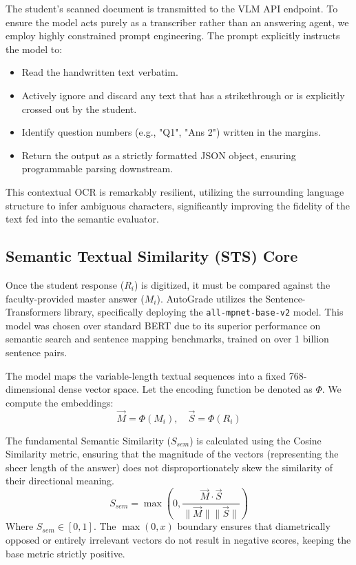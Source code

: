 \documentclass[conference]{IEEEtran}
\begin{document}
The student's scanned document is transmitted to the VLM API endpoint. To ensure the model acts purely as a transcriber rather than an answering agent, we employ highly constrained prompt engineering. The prompt explicitly instructs the model to:
\begin{itemize}
    \item Read the handwritten text verbatim.
    \item Actively ignore and discard any text that has a strikethrough or is explicitly crossed out by the student.
    \item Identify question numbers (e.g., "Q1", "Ans 2") written in the margins.
    \item Return the output as a strictly formatted JSON object, ensuring programmable parsing downstream.
\end{itemize}
This contextual OCR is remarkably resilient, utilizing the surrounding language structure to infer ambiguous characters, significantly improving the fidelity of the text fed into the semantic evaluator.

\subsection{Semantic Textual Similarity (STS) Core}
Once the student response ($R_i$) is digitized, it must be compared against the faculty-provided master answer ($M_i$). AutoGrade utilizes the Sentence-Transformers library, specifically deploying the \texttt{all-mpnet-base-v2} model. This model was chosen over standard BERT due to its superior performance on semantic search and sentence mapping benchmarks, trained on over 1 billion sentence pairs.

The model maps the variable-length textual sequences into a fixed 768-dimensional dense vector space. Let the encoding function be denoted as $\Phi$. We compute the embeddings:
\begin{equation}
\vec{M} = \Phi(M_i), \quad \vec{S} = \Phi(R_i)
\end{equation}

The fundamental Semantic Similarity ($S_{sem}$) is calculated using the Cosine Similarity metric, ensuring that the magnitude of the vectors (representing the sheer length of the answer) does not disproportionately skew the similarity of their directional meaning.
\begin{equation}
S_{sem} = \max \left(0, \frac{\vec{M} \cdot \vec{S}}{\|\vec{M}\| \|\vec{S}\|} \right)
\end{equation}
Where $S_{sem} \in [0, 1]$. The $\max(0, x)$ boundary ensures that diametrically opposed or entirely irrelevant vectors do not result in negative scores, keeping the base metric strictly positive.
\end{document}
